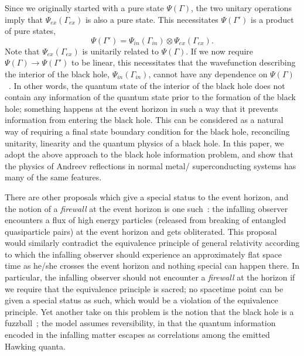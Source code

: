 \documentclass[12pt,letterpaper,aps,onecolumn,superscriptaddress,floatfix,notitlepage]{revtex4-1}
\begin{document}
	Since we originally started with a pure state $\Psi(\Gamma)$, the two unitary operations imply that $\Psi_{ex}(\Gamma_{ex})$ is also a pure state. This necessitates $\Psi(\Gamma')$ is a product of pure states,
	\begin{equation}
	\Psi(\Gamma') =\Psi_{in}(\Gamma_{in})\otimes\Psi_{ex}(\Gamma_{ex}).
	\end{equation}
	Note that $\Psi_{ex}(\Gamma_{ex})$ is unitarily related to $\Psi(\Gamma)$. If we now require $\Psi(\Gamma)\rightarrow\Psi(\Gamma')$ to be linear, this necessitates that the wavefunction describing the interior of the black hole, $\Psi_{in}(\Gamma_{in})$, cannot have any dependence on $\Psi(\Gamma)$~\cite{complementarity,infopara}. In other words, the quantum state of the interior of the black hole does not contain any information of the quantum state prior to the formation of the black hole; something happens at the event horizon in such a way that it prevents information from entering the black hole. This can be considered as a natural way of requiring a final state boundary condition for the black hole, reconciling unitarity, linearity and the quantum physics of a black hole. In this paper, we adopt the above approach to the black hole information problem, and show that the physics of Andreev reflections in normal metal/ superconducting systems has many of the same features.
	
	There are other proposals which give a special status to the event horizon, and the notion of a \textit{firewall} at the event horizon is one such~\cite{firewall}: the infalling observer encounters a flux of high energy particles (released from breaking of entangled quasiparticle pairs) at the event horizon and gets obliterated. This proposal would similarly contradict the equivalence principle of general relativity according to which the infalling observer should experience an approximately flat space time as he/she crosses the event horizon and nothing special can happen there. In particular, the infalling observer should not encounter a \textit{firewall} at the horizon if we require that the equivalence principle is sacred; no spacetime point can be given a special status as such, which would be a violation of the equivalence principle. Yet another take on this problem is the notion that the black hole is a fuzzball~\cite{mathur2009fuzzballs}; the model assumes reversibility, in that the quantum information encoded in the infalling matter escapes as correlations among the emitted Hawking quanta.     
	
\end{document}
